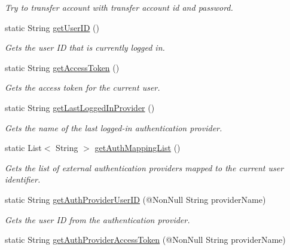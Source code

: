 \begin{DoxyCompactItemize}
\begin{DoxyCompactList}\small\item\em Try to transfer account with transfer account id and password. \end{DoxyCompactList}\item 
static String \hyperlink{classcom_1_1toast_1_1android_1_1gamebase_1_1_gamebase_ab7c1e87ef968e274d77774ea7c814f07}{get\+User\+ID} ()
\begin{DoxyCompactList}\small\item\em Gets the user ID that is currently logged in. \end{DoxyCompactList}\item 
static String \hyperlink{classcom_1_1toast_1_1android_1_1gamebase_1_1_gamebase_a7415fdfef5db5d7e6b02e82f62927e9b}{get\+Access\+Token} ()
\begin{DoxyCompactList}\small\item\em Gets the access token for the current user. \end{DoxyCompactList}\item 
static String \hyperlink{classcom_1_1toast_1_1android_1_1gamebase_1_1_gamebase_aab024fc853da20582cd6cd85ecd9f6a6}{get\+Last\+Logged\+In\+Provider} ()
\begin{DoxyCompactList}\small\item\em Gets the name of the last logged-\/in authentication provider. \end{DoxyCompactList}\item 
static List$<$ String $>$ \hyperlink{classcom_1_1toast_1_1android_1_1gamebase_1_1_gamebase_abc355ef4a49b5c6348ee31890df16431}{get\+Auth\+Mapping\+List} ()
\begin{DoxyCompactList}\small\item\em Gets the list of external authentication providers mapped to the current user identifier. \end{DoxyCompactList}\item 
static String \hyperlink{classcom_1_1toast_1_1android_1_1gamebase_1_1_gamebase_af1dc0a9194eff5829c859a6a6aa4ab7c}{get\+Auth\+Provider\+User\+ID} (@Non\+Null String provider\+Name)
\begin{DoxyCompactList}\small\item\em Gets the user ID from the authentication provider. \end{DoxyCompactList}\item 
static String \hyperlink{classcom_1_1toast_1_1android_1_1gamebase_1_1_gamebase_ae2f90bca5deb4d7dff72b890a257814f}{get\+Auth\+Provider\+Access\+Token} (@Non\+Null String provider\+Name)

\end{DoxyCompactItemize}
